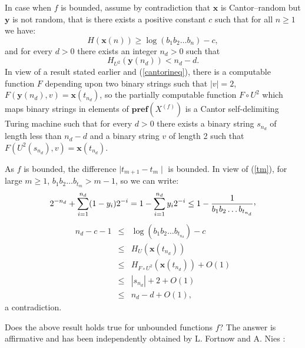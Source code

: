 \documentclass{elsart}
\begin{document}
In case when $f$ is bounded, assume by contradiction that ${\mathbf x}$ is
Cantor--random but ${\mathbf y}$ is not random, that is there exists a positive
constant $c$ such that for all $n\ge 1$ we have:
\begin{equation}
\label{crand}
H({\mathbf x}(n)) \ge \log (b_{1}b_{2}\ldots b_{n}) -c,
\end{equation}
and for every $d>0$ there exists an integer $n_{d}>0$ such that
\begin{equation}
\label{not-brand}
H_{U^{2}} ({\mathbf y}(n_{d})) < n_{d} - d.
\end{equation}
In view of a result stated earlier
 and (\ref{cantorineq}), there is a
computable function $F$ depending upon two binary strings such that $|v|=2$,
$F({\mathbf y} (n_{d}), v) =
{\mathbf x} (t_{n_{d}})$, so the partially computable function $F \circ U^{2}$
which
maps binary strings in elements of ${{\mathbf{pref}({{X^{(f)}}})}}$ is a
Cantor self-delimiting
Turing machine such that for every $d>0$ there exists a binary string
$s_{n_{d}}$ of length less than
$n_{d} - d$ and a binary string $v$ of length  2 such that
$F(U^{2}(s_{n_{d}}), v) = {\mathbf x}(t_{n_{d}})$.

As $f$ is bounded, the difference  $\mid t_{m+1}-  t_{m}\mid$ is bounded.  In view of (\ref{tm}), for large $m\ge 1$,
$b_{1}b_{2}\ldots b_{t_{m}} > m-1$, so we can write:
\begin{equation}
\label{errorcb}
2^{-n_{d}} + \sum_{i=1}^{n_{d}} (1-y_{i})2^{-i} = 1 - \sum_{i=1}^{n_{d}}
y_{i}2^{-i} \le  1 - \frac{1}{b_{1}b_{2}\ldots b_{t_{n_{d}}}}{\raisebox{.5ex}{,}}
\end{equation}
\begin{eqnarray*}
n_{d} - c -1  & \le & \log (b_{1}b_{2}\ldots b_{t_{n_{d}}}) - c\\
 & \le &  H_{U}({\mathbf x} (t_{n_{d}}))\\
 & \le & H_{F \circ U^{2}} ({\mathbf x} (t_{n_{d}})) + O(1)\\
 & \le & |s_{n_{d}}| +  2 + O(1)\\
& \le & n_{d} -d +  O(1),
\end{eqnarray*}
a contradiction.


Does the above result holds true for unbounded
functions $f$? The answer is affirmative and has been independently obtained
by L. Fortnow and A. Nies \cite{Nies-2003}:
\end{document}
